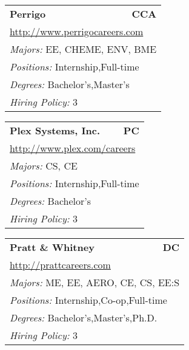 \documentclass[twoside]{article}
\begin{document}
\begin{center}
\begin{multicols}{3}
\begin{FlushLeft}
\begin{minipage}{\columnwidth}
\end{minipage}
 
\begin{minipage}{\columnwidth}\begin{tabularx}{.95\columnwidth}{Xr}
                 {\Large\bf Perrigo} & {\Large\bf CCA}\\
    \multicolumn{2}{p{.95\columnwidth}}{\url{http://www.perrigocareers.com}}\\
    \multicolumn{2}{p{.95\columnwidth}}{\emph{Majors:} EE, CHEME, ENV, BME}\\
    \multicolumn{2}{p{.95\columnwidth}}{\emph{Positions:} Internship,Full-time}\\
    \multicolumn{2}{p{.95\columnwidth}}{\emph{Degrees:} Bachelor's,Master's}\\
    \multicolumn{2}{p{.95\columnwidth}}{\emph{Hiring Policy:} 3}\\
    \end{tabularx}
    
\end{minipage}
 
\begin{minipage}{\columnwidth}\begin{tabularx}{.95\columnwidth}{Xr}
                 {\Large\bf Plex Systems, Inc.} & {\Large\bf PC}\\
    \multicolumn{2}{p{.95\columnwidth}}{\url{http://www.plex.com/careers}}\\
    \multicolumn{2}{p{.95\columnwidth}}{\emph{Majors:} CS, CE}\\
    \multicolumn{2}{p{.95\columnwidth}}{\emph{Positions:} Internship,Full-time}\\
    \multicolumn{2}{p{.95\columnwidth}}{\emph{Degrees:} Bachelor's}\\
    \multicolumn{2}{p{.95\columnwidth}}{\emph{Hiring Policy:} 3}\\
    \end{tabularx}
    
\end{minipage}
 
\begin{minipage}{\columnwidth}\begin{tabularx}{.95\columnwidth}{Xr}
                 {\Large\bf Pratt \& Whitney} & {\Large\bf DC}\\
    \multicolumn{2}{p{.95\columnwidth}}{\url{http://prattcareers.com}}\\
    \multicolumn{2}{p{.95\columnwidth}}{\emph{Majors:} ME, EE, AERO, CE, CS, EE:S}\\
    \multicolumn{2}{p{.95\columnwidth}}{\emph{Positions:} Internship,Co-op,Full-time}\\
    \multicolumn{2}{p{.95\columnwidth}}{\emph{Degrees:} Bachelor's,Master's,Ph.D.}\\
    \multicolumn{2}{p{.95\columnwidth}}{\emph{Hiring Policy:} 3}\\
    \end{tabularx}
    

\end{minipage}
\end{FlushLeft}
\end{multicols}
\end{center}
\end{document}
